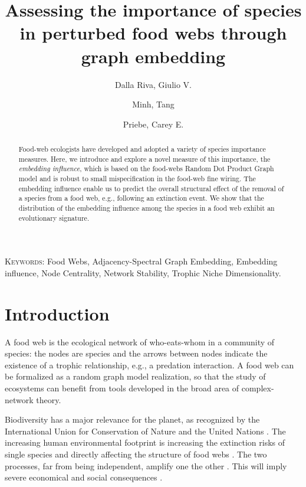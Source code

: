 \documentclass[12pt]{article}
\theoremstyle{definition}
\begin{document}
\author{Dalla Riva, Giulio V. \and Minh, Tang \and Priebe, Carey E.}
\title{Assessing the importance of species in perturbed food webs through graph embedding}

\maketitle

\begin{abstract}
Food-web ecologists have developed and adopted a variety of species importance measures. Here, we introduce and explore a novel measure of this importance, the {\em embedding influence}, which is based on the food-webs Random Dot Product Graph model and is robust to small mispecification in the food-web fine wiring. The embedding influence enable us to predict the overall structural effect of the removal of a species from a food web, e.g., following an extinction event. We show that the distribution of the embedding influence among the species in a food web exhibit an evolutionary signature.
\end{abstract}

\vspace*{.3in}
\noindent\textsc{Keywords}: {Food Webs, Adjacency-Spectral Graph Embedding, Embedding influence, Node Centrality, Network Stability, Trophic Niche Dimensionality.}
\vspace*{.3in}

\section{Introduction}\label{sec:intro}

A food web is the ecological network of who-eats-whom in a community of species: the nodes are species and the arrows between nodes indicate the existence of a trophic relationship, e.g., a predation interaction. A food web can be formalized as a random graph model realization, so that the study of ecosystems can benefit from tools developed in the broad area of complex-network theory.

Biodiversity \cite{wilcox1984situ} has a major relevance for the planet, as recognized by the International Union for Conservation of Nature and the United Nations \cite{hawksworth1995biodiversity}. The increasing human environmental footprint is increasing the extinction risks of single species  and directly affecting the structure of food webs \cite{pimm1984complexity,otto2007allometric,cote2010rethinking,bellard2012impacts,XXX}. The two processes, far from being independent, amplify one the other \cite{saterberg2013high}. This will imply severe economical and social consequences \cite{cardinale2012biodiversity}.
\end{document}
